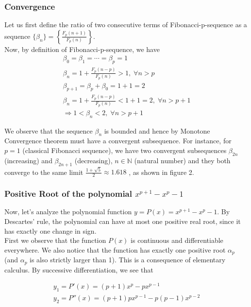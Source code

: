 \documentclass{ijcsa}
\begin{document}
\subsubsection*{Convergence}
Let us first define the ratio of two consecutive terms of Fibonacci-p-sequence as a sequence $\{\beta_{n}\}=\left\{\frac{F_{p}(n+1)}{F_p(n)}\right\}$. \\
Now, by definition of Fibonacci-p-sequence, we have
\begin{eqnarray*}
{\beta}_0={\beta}_1=\cdots={\beta}_p=1 \\ 
{\beta}_n=1+\frac{F_{p}(n-p)}{F_p(n)}>1, \; \forall{n}>p \\
{\beta}_{p+1}={\beta}_p+{\beta}_0=1+1=2\\
{\beta}_n=1+\frac{F_{p}(n-p)}{F_p(n)} < 1 + 1 = 2, \; \forall{n}>p+1 \\
\Rightarrow 1 < {\beta}_n < 2 , \; \forall{n}>p+1
\end{eqnarray*}

We observe that the sequence ${\beta}_n$ is bounded and hence by Monotone Convergence theorem must 
have a convergent subsequence. For instance, for $p=1$ (classical Fibonacci sequence), we have two convergent subsequences
${\beta}_{2n}$ (increasing) and ${\beta}_{2n+1}$ (decreasing), $n \in \mathbb{N}$ (natural number) and they both converge to the same limit
$\frac{1+\sqrt{5}}{2}\approx 1.618$ \cite{craw00}, as shown in figure 2.  

\subsubsection*{Positive Root of the polynomial $x^{p+1}-x^{p}-1$}
Now, let's analyze the polynomial function $y = P(x) = x^{p+1}-x^{p}-1$. By Descartes' rule, the polynomial
can have at most one positive real root, since it has exactly one change in sign. \\

First we observe that the function $P(x)$ is continuous and differentiable everywhere. We also notice that the function has exactly one positive root $\alpha_{p}$ (and $\alpha_{p}$ is also strictly larger than 1). This is a consequence of elementary calculus. 
By successive differentiation, we see that 

\begin{eqnarray*}
y_{1} = P'(x) = (p+1)x^{p}-px^{p-1} \\	
y_{2} = P''(x) = (p+1)px^{p-1}-p(p-1)x^{p-2} \\
\end{eqnarray*}
\end{document}
